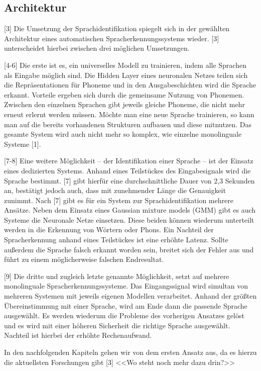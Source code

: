 \subsection{Architektur}
[3] Die Umsetzung der Sprachidentifikation spiegelt sich in der gewählten Architektur eines automatischen Spracherkennungssystems wieder. [3] unterscheidet hierbei zwischen drei möglichen Umsetzungen.

[4-6] Die erste ist es, ein universelles Modell zu trainieren, indem alle Sprachen als Eingabe möglich sind. Die Hidden Layer eines neuronalen Netzes teilen sich die Repräsentationen für Phoneme und in den Ausgabeschichten wird die Sprache erkannt.
Vorteile ergeben sich durch die gemeinsame Nutzung von Phonemen. Zwischen den einzelnen Sprachen gibt jeweils gleiche Phoneme, die nicht mehr erneut erlernt werden müssen. Möchte man eine neue Sprache trainieren, so kann man auf die bereits vorhandenen Strukturen aufbauen und diese mitnutzen.
Das gesamte System wird auch nicht mehr so komplex, wie einzelne monolinguale Systeme [1].

[7-8] Eine weitere Möglichkeit – der Identifikation einer Sprache – ist der Einsatz eines dedizierten Systems. Anhand eines Teilstückes des Eingabesignals wird die Sprache bestimmt. [7] gibt hierfür eine durchschnittliche Dauer von 2,3 Sekunden an, bestätigt jedoch auch, dass mit zunehmender Länge die Genauigkeit zunimmt.
Nach [7] gibt es für ein System zur Sprachidentifikation mehrere Ansätze. Neben dem Einsatz eines Gaussian mixture models (GMM) gibt es auch Systeme die Neuronale Netze einsetzen. Diese beiden können wiederum unterteilt werden in die Erkennung von Wörtern oder Phons.
Ein Nachteil der Spracherkennung anhand eines Teilstückes ist eine erhöhte Latenz. Sollte außerdem die Sprache falsch erkannt worden sein, breitet sich der Fehler aus und führt zu einem möglicherweise falschen Endresultat.

[9] Die dritte und zugleich letzte genannte Möglichkeit, setzt auf mehrere monolinguale Spracherkennungssysteme. Das Eingangssignal wird simultan von mehreren Systemen mit jeweils eigenen Modellen verarbeitet.
Anhand der größten Übereinstimmung mit einer Sprache, wird am Ende dann die passende Sprache ausgewählt. Es werden wiederum die Probleme des vorherigen Ansatzes gelöst und es wird mit einer höheren Sicherheit die richtige Sprache ausgewählt.
Nachteil ist hierbei der erhöhte Rechenaufwand.

In den nachfolgenden Kapiteln gehen wir von dem ersten Ansatz aus, da es hierzu die aktuellsten Forschungen gibt [3] <<Wo steht noch mehr dazu drin?>>

